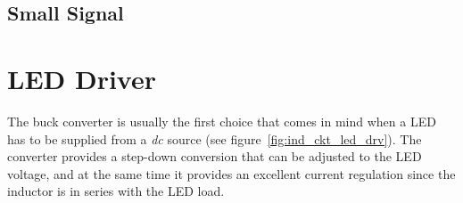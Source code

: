 \subsection{Small Signal }




\section{LED Driver}

The buck converter is usually the first choice that comes in mind when a LED has to be supplied from a \emph{dc} source (see figure~\ref{fig:ind_ckt_led_drv}). The converter provides a step-down conversion that can be adjusted to the LED voltage, and at the same time it provides an excellent current regulation since the inductor is in series with the LED load.

